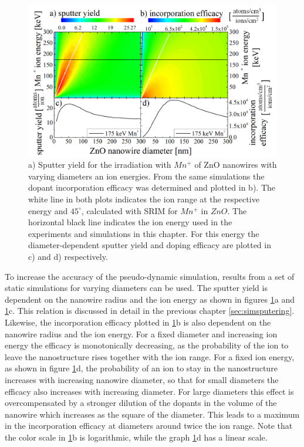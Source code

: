 \begin{figure}
	\centering
		\includegraphics[width=.8\textwidth]{images/sputterincorporate.png}
	\caption{a) Sputter yield for the irradiation with $Mn^+$ of ZnO nanowires with varying diameters an ion energies. From the same simulations the dopant incorporation efficacy was determined and plotted in b). The white line in both plots indicates the ion range at the respective energy and $45^\circ$, calculated with SRIM for $Mn^+$ in $ZnO$. The horizontal black line indicates the ion energy used in the experiments and simulations in this chapter. For this energy the diameter-dependent sputter yield and doping efficacy are plotted in c) and d) respectively.}
	\label{sputterincorporate}
\end{figure} 

To increase the accuracy of the pseudo-dynamic simulation, results from a set of static simulations for varying diameters can be used. The sputter yield is dependent on the nanowire radius and the ion energy as shown in figures \ref{sputterincorporate}a and \ref{sputterincorporate}c. This relation is discussed in detail in the previous chapter \ref{sec:simsputering}. Likewise, the incorporation efficacy plotted in \ref{sputterincorporate}b is also dependent on the nanowire radius and the ion energy. For a fixed diameter and increasing ion energy the efficacy is monotonically decreasing, as the probability of the ion to leave the nanostructure rises together with the ion range. For a fixed ion energy, as shown in figure \ref{sputterincorporate}d, the probability of an ion to stay in the nanostructure increases with increasing nanowire diameter, so that for small diameters the efficacy also increases with increasing diameter. For large diameters this effect is overcompensated by a stronger dilution of the dopants in the volume of the nanowire which increases as the square of the diameter. This leads to a maximum in the incorporation efficacy at diameters around twice the ion range. Note that the color scale in \ref{sputterincorporate}b is logarithmic, while the graph \ref{sputterincorporate}d has a linear scale.



